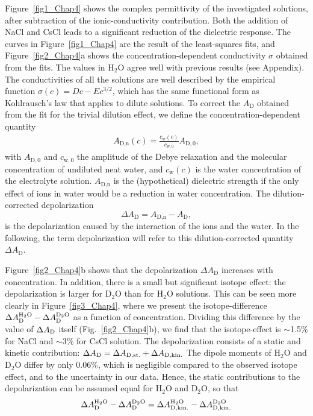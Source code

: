 Figure~\ref{fig1_Chap4} shows the complex permittivity of the investigated solutions, after subtraction of the ionic-conductivity contribution. Both the addition of NaCl and CsCl leads to a significant reduction of the dielectric response. 
The curves in Figure~\ref{fig1_Chap4} are the result of the least-squares fits, and Figure~\ref{fig2_Chap4}a shows the concentration-dependent conductivity $\sigma$ obtained from the fits. The values in H$_2$O agree well with previous results (see Appendix).\!\cite{Buchner1999,Bianchi1989} The conductivities of all the solutions are well described by the empirical function $\sigma (c) = D c - E c^{3/2}$, which has the same functional form as Kohlrausch's law that applies to dilute solutions. To correct the $A_\text{D}$ obtained from the fit for the trivial dilution effect, we define the concentration-dependent quantity
\begin{eqnarray}
A_\text{D,n}(c) = \frac{c_\text{w}(c)}{c_{\text{w},0}} A_{\text{D},0},
\label{eq4}
\end{eqnarray}
with $A_{\text{D},0}$ and $c_{\text{w},0}$ the amplitude of the Debye relaxation and the molecular concentration of undiluted neat water, and $c_\text{w}(c)$ is the water concentration of the electrolyte solution.
$A_\text{D,n}$ is the (hypothetical) dielectric strength if the only effect of ions in water would be a reduction in water concentration. The dilution-corrected depolarization
\begin{equation}
\Delta A_\text{D} = A_{\text{D,n}} - A_\text{D},
\end{equation}
is the depolarization caused by the interaction of the ions and the water. In the following, the term depolarization will refer to this dilution-corrected quantity $\Delta A_\text{D}$.





Figure~\ref{fig2_Chap4}b shows that the depolarization $\Delta A_\text{D}$ increases with concentration. In addition, there is a small but significant isotope effect: the depolarization is larger for D$_2$O than for H$_2$O solutions. This can be seen more clearly in Figure~\ref{fig3_Chap4}, where we present the isotope-difference $\Delta A_{\rm D}^{\rm H_2O}-\Delta A_{\rm D}^{\rm D_2O}$ as a function of concentration.  Dividing this difference by the value of $\Delta A_{\rm D}$ itself (Fig.~\ref{fig2_Chap4}b), we find that the isotope-effect is $\sim$1.5\% for NaCl and $\sim$3\% for CsCl solution.  The depolarization consists of a static and kinetic contribution:\!\cite{Hubbard1977,Hubbard1977a,Hubbard1979a,VanderZwan1982,VanderZwan1983a,Barthel1992} $\Delta A_{\rm D} = \Delta A_{\text{D,st.}} + \Delta A_{\text{D,kin.}}$ The dipole moments of H$_2$O and D$_2$O differ by only 0.06\%,\!\cite{Clough1973} which is negligible compared to the observed isotope effect, and to the uncertainty in our data. Hence, the static contributions to the depolarization can be assumed equal for H$_2$O and D$_2$O, so that 
\begin{equation}
\Delta A_{\rm D}^{\rm H_2O}-\Delta A_{\rm D}^{\rm D_2O} = \Delta A_{\rm D,kin.}^{\rm H_2O}-\Delta A_{\rm D,kin.}^{\rm D_2O}
\label{Skin} 
\end{equation}

